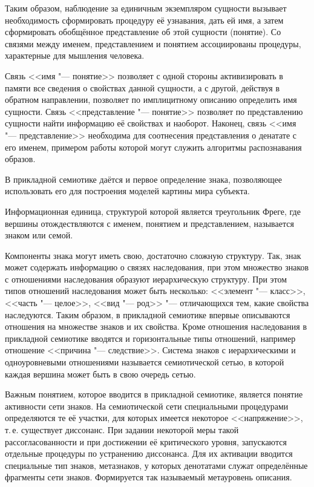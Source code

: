 Таким образом, наблюдение за единичным экземпляром сущности вызывает необходимость сформировать процедуру её узнавания, дать ей имя, а затем сформировать обобщённое представление об этой сущности (понятие). Со связями между именем, представлением и понятием ассоциированы процедуры, характерные для мышления человека.

Связь <<имя "--- понятие>> позволяет с одной стороны активизировать в памяти все сведения о свойствах данной сущности, а с другой, действуя в обратном направлении, позволяет по имплицитному описанию определить имя сущности. Связь <<представление "--- понятие>> позволяет по представлению сущности найти информацию её свойствах и наоборот. Наконец, связь <<имя "--- представление>> необходима для соотнесения представления о денатате с его именем, примером работы которой могут служить алгоритмы распознавания образов.

В прикладной семиотике даётся и первое определение знака, позволяющее использовать его для построения моделей картины мира субъекта.

\begin{Def}
	Информационная единица, структурой которой является треугольник Фреге, где вершины отождествляются с именем, понятием и представлением, называется знаком или семой.
\end{Def}

Компоненты знака могут иметь свою, достаточно сложную структуру. Так, знак может содержать информацию о связях наследования, при этом множество знаков с отношениями наследования образуют иерархическую структуру. При этом типов отношений наследования может быть несколько: <<элемент "--- класс>>, <<часть "--- целое>>, <<вид "--- род>> "--- отличающихся тем, какие свойства наследуются. Таким образом, в прикладной семиотике впервые описываются отношения на множестве знаков и их свойства. Кроме отношения наследования в прикладной семиотике вводятся и горизонтальные типы отношений, например отношение <<причина "--- следствие>>. Система знаков с иерархическими и одноуровневыми отношениями называется семиотической сетью, в которой каждая вершина может быть в свою очередь сетью.

Важным понятием, которое вводится в прикладной семиотике, является понятие активности сети знаков. На семиотической сети специальными процедурами определяются те её участки, для которых имеется некоторое <<напряжение>>, т.\,е. существует диссонанс. При задании некоторой меры такой рассогласованности и при достижении её критического уровня, запускаются отдельные процедуры по устранению диссонанса. Для их активации вводится специальные тип знаков, метазнаков, у которых денотатами служат определённые фрагменты сети знаков. Формируется так называемый метауровень описания.

